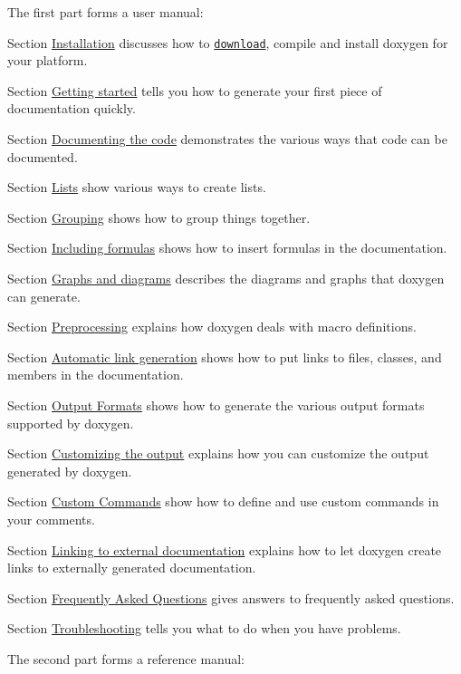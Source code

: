 The first part forms a user manual: 
\begin{DoxyItemize}
\item Section \hyperlink{install}{Installation} discusses how to \href{http://www.doxygen.org/download.html}{\tt download}, compile and install doxygen for your platform. 
\item Section \hyperlink{starting}{Getting started} tells you how to generate your first piece of documentation quickly. 
\item Section \hyperlink{docblocks}{Documenting the code} demonstrates the various ways that code can be documented. 
\item Section \hyperlink{lists}{Lists} show various ways to create lists. 
\item Section \hyperlink{grouping}{Grouping} shows how to group things together. 
\item Section \hyperlink{formulas}{Including formulas} shows how to insert formulas in the documentation. 
\item Section \hyperlink{diagrams}{Graphs and diagrams} describes the diagrams and graphs that doxygen can generate. 
\item Section \hyperlink{preprocessing}{Preprocessing} explains how doxygen deals with macro definitions. 
\item Section \hyperlink{autolink}{Automatic link generation} shows how to put links to files, classes, and members in the documentation. 
\item Section \hyperlink{output}{Output Formats} shows how to generate the various output formats supported by doxygen. 
\item Section \hyperlink{customize}{Customizing the output} explains how you can customize the output generated by doxygen. 
\item Section \hyperlink{custcmd}{Custom Commands} show how to define and use custom commands in your comments. 
\item Section \hyperlink{external}{Linking to external documentation} explains how to let doxygen create links to externally generated documentation. 
\item Section \hyperlink{faq}{Frequently Asked Questions} gives answers to frequently asked questions. 
\item Section \hyperlink{trouble}{Troubleshooting} tells you what to do when you have problems. 
\end{DoxyItemize}

The second part forms a reference manual:


